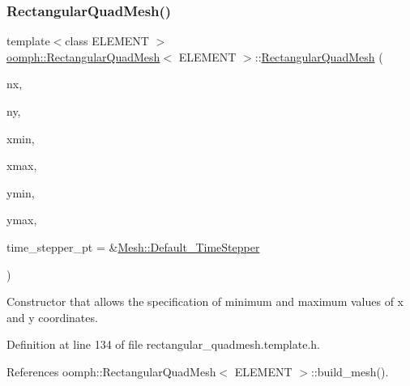 \subsubsection{\texorpdfstring{Rectangular\+Quad\+Mesh()}{RectangularQuadMesh()}\hspace{0.1cm}{\footnotesize\ttfamily [3/5]}}
{\footnotesize\ttfamily template$<$class E\+L\+E\+M\+E\+NT $>$ \\
\hyperlink{classoomph_1_1RectangularQuadMesh}{oomph\+::\+Rectangular\+Quad\+Mesh}$<$ E\+L\+E\+M\+E\+NT $>$\+::\hyperlink{classoomph_1_1RectangularQuadMesh}{Rectangular\+Quad\+Mesh} (\begin{DoxyParamCaption}\item[{const unsigned \&}]{nx,  }\item[{const unsigned \&}]{ny,  }\item[{const double \&}]{xmin,  }\item[{const double \&}]{xmax,  }\item[{const double \&}]{ymin,  }\item[{const double \&}]{ymax,  }\item[{\hyperlink{classoomph_1_1TimeStepper}{Time\+Stepper} $\ast$}]{time\+\_\+stepper\+\_\+pt = {\ttfamily \&\hyperlink{classoomph_1_1Mesh_a12243d0fee2b1fcee729ee5a4777ea10}{Mesh\+::\+Default\+\_\+\+Time\+Stepper}} }\end{DoxyParamCaption})\hspace{0.3cm}{\ttfamily [inline]}}



Constructor that allows the specification of minimum and maximum values of x and y coordinates. 



Definition at line 134 of file rectangular\+\_\+quadmesh.\+template.\+h.



References oomph\+::\+Rectangular\+Quad\+Mesh$<$ E\+L\+E\+M\+E\+N\+T $>$\+::build\+\_\+mesh().

\mbox{\label{classoomph_1_1RectangularQuadMesh_a40f120e00d682026e54593ca0f823535}} 
